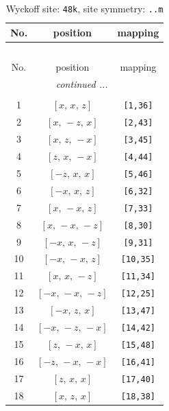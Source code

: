 \documentclass[fleqn,8pt]{jsarticle}
\begin{document}
\renewcommand{\arraystretch}{1.2}
\begin{longtable}{ccc}
\caption{Wyckoff site: {\tt 48k}, site symmetry: {\tt ..m}}
 \\
 \hline \hline
No. & position & mapping \\ \hline \endfirsthead

\multicolumn{2}{l}{\tablename\ \thetable{}} \\
 \hline \hline
No. & position & mapping \\ \hline \endhead

 \hline \hline
\multicolumn{2}{r}{\footnotesize\it continued ...} \\ \endfoot

 \hline \hline
\multicolumn{2}{r}{} \\ \endlastfoot

1 & $\left[ x,\, x,\, z \right]$ & {\tt [1,36]} \\ \hline
2 & $\left[ x,\, - z,\, x \right]$ & {\tt [2,43]} \\ \hline
3 & $\left[ x,\, z,\, - x \right]$ & {\tt [3,45]} \\ \hline
4 & $\left[ z,\, x,\, - x \right]$ & {\tt [4,44]} \\ \hline
5 & $\left[ - z,\, x,\, x \right]$ & {\tt [5,46]} \\ \hline
6 & $\left[ - x,\, x,\, z \right]$ & {\tt [6,32]} \\ \hline
7 & $\left[ x,\, - x,\, z \right]$ & {\tt [7,33]} \\ \hline
8 & $\left[ x,\, - x,\, - z \right]$ & {\tt [8,30]} \\ \hline
9 & $\left[ - x,\, x,\, - z \right]$ & {\tt [9,31]} \\ \hline
10 & $\left[ - x,\, - x,\, z \right]$ & {\tt [10,35]} \\ \hline
11 & $\left[ x,\, x,\, - z \right]$ & {\tt [11,34]} \\ \hline
12 & $\left[ - x,\, - x,\, - z \right]$ & {\tt [12,25]} \\ \hline
13 & $\left[ - x,\, z,\, x \right]$ & {\tt [13,47]} \\ \hline
14 & $\left[ - x,\, - z,\, - x \right]$ & {\tt [14,42]} \\ \hline
15 & $\left[ z,\, - x,\, x \right]$ & {\tt [15,48]} \\ \hline
16 & $\left[ - z,\, - x,\, - x \right]$ & {\tt [16,41]} \\ \hline
17 & $\left[ z,\, x,\, x \right]$ & {\tt [17,40]} \\ \hline
18 & $\left[ x,\, z,\, x \right]$ & {\tt [18,38]} \\ \hline

\end{longtable}
\end{document}
